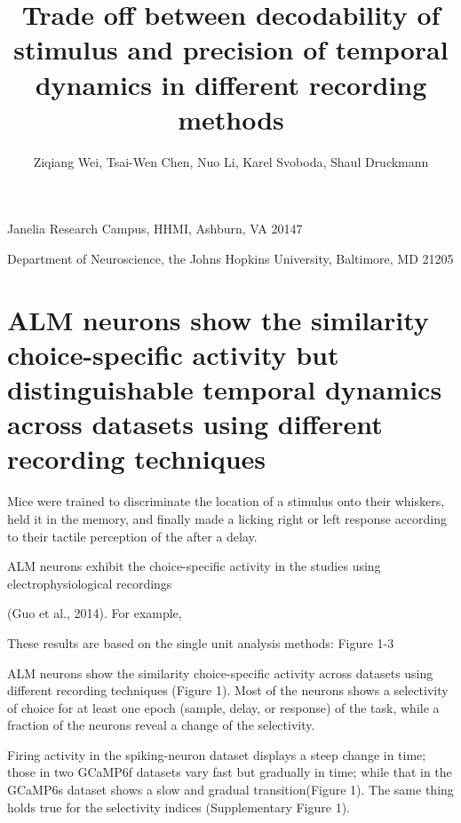 \documentclass[12pt, oneside]{nature}
\title{Trade off between decodability of stimulus and precision of temporal dynamics 
in different recording methods}
\author{Ziqiang Wei, Tsai-Wen Chen, Nuo Li, Karel Svoboda, Shaul Druckmann}
\date{}
\begin{document}
\maketitle
\begin{affiliations}
 \item Janelia Research Campus, HHMI, Ashburn, VA 20147
 \item Department of Neuroscience, the Johns Hopkins University, Baltimore, MD 21205
\end{affiliations}

\newpage

\begin{abstract}
\end{abstract}

\newpage


\section*{ALM neurons show the similarity choice-specific activity but 
distinguishable temporal dynamics across datasets using different recording techniques}

Mice were trained to discriminate the location of a stimulus onto their
whiskers, held it in the memory, and finally made a licking right or
left response according to their tactile perception of the after a delay.

ALM neurons exhibit the choice-specific activity
in the studies using electrophysiological recordings

(Guo et al., 2014). For example, 


These results are based on the single unit analysis methods: Figure 1-3

\noindent ALM neurons show the similarity choice-specific activity 
across datasets using different recording techniques (Figure 1).
Most of the neurons shows a selectivity of choice for at least 
one epoch (sample, delay, or response) of the task, while a 
fraction of the neurons reveal a change of the selectivity.

\noindent Firing activity in the spiking-neuron dataset displays a 
steep change in time; those in two GCaMP6f datasets vary fast 
but gradually in time; while that in the GCaMP6s dataset shows 
a slow and gradual transition(Figure 1). The same thing holds true for the
selectivity indices (Supplementary Figure 1).
\end{document}
